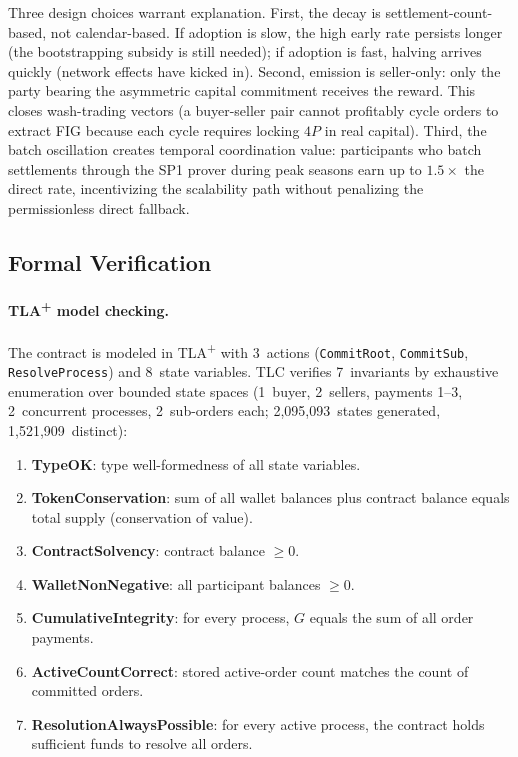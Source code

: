 \documentclass[11pt,a4paper]{article}
\theoremstyle{definition}
\theoremstyle{remark}
\newcommand{\pay}{P}           %
\newcommand{\cumval}{G}        %
\begin{document}
Three design choices warrant explanation. First, the decay is
settlement-count-based, not calendar-based. If adoption is slow, the
high early rate persists longer (the bootstrapping subsidy is still
needed); if adoption is fast, halving arrives quickly (network effects
have kicked in). Second, emission is seller-only: only the party
bearing the asymmetric capital commitment receives the reward. This
closes wash-trading vectors (a buyer-seller pair cannot profitably
cycle orders to extract FIG because each cycle requires locking $4\pay$
in real capital). Third, the batch oscillation creates temporal
coordination value: participants who batch settlements through the
SP1 prover during peak seasons earn up to $1.5\times$ the direct rate,
incentivizing the scalability path without penalizing the permissionless
direct fallback.

\subsection{Formal Verification}

\paragraph{TLA\textsuperscript{+} model checking.}
The contract is modeled in TLA\textsuperscript{+} with 3~actions
(\texttt{CommitRoot}, \texttt{CommitSub}, \texttt{ResolveProcess}) and
8~state variables. TLC verifies 7~invariants by exhaustive
enumeration over bounded state spaces (1~buyer, 2~sellers, payments
1--3, 2~concurrent processes, 2~sub-orders each; 2{,}095{,}093~states
generated, 1{,}521{,}909~distinct):
\begin{enumerate}[label=\textbf{I\arabic*}]
  \item \textbf{TypeOK}: type well-formedness of all state variables.
  \item \textbf{TokenConservation}: sum of all wallet balances plus
    contract balance equals total supply (conservation of value).
  \item \textbf{ContractSolvency}: contract balance $\geq 0$.
  \item \textbf{WalletNonNegative}: all participant balances $\geq 0$.
  \item \textbf{CumulativeIntegrity}: for every process,
    $\cumval$ equals the sum of all order payments.
  \item \textbf{ActiveCountCorrect}: stored active-order count
    matches the count of committed orders.
  \item \textbf{ResolutionAlwaysPossible}: for every active process,
    the contract holds sufficient funds to resolve all orders.
\end{enumerate}
\end{document}
